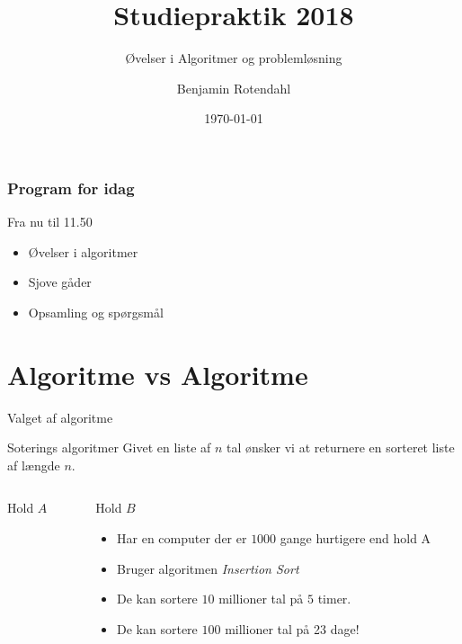 \documentclass[12pt,t]{beamer}
\title{Studiepraktik 2018}
\subtitle{Øvelser i Algoritmer og problemløsning}
\author{
  Benjamin Rotendahl  \\
}
\date[]{\today}
\begin{document}
\frame[plain]{\titlepage}
\frame{\tableofcontents}


\begin{frame}
  \frametitle{Program for idag}
  \begin{block}{Fra nu til 11.50}
    \begin{itemize}
      \item Øvelser i algoritmer \pause
      \item Sjove gåder \pause
      \item Opsamling og spørgsmål
    \end{itemize}
  \end{block}
\end{frame}


\section{Algoritme vs Algoritme}
\begin{frame}[t]{Valget af algoritme}
  \begin{exampleblock}{Soterings algoritmer}
    Givet en liste af $n$ tal ønsker vi at returnere en sorteret liste
    af længde $n$.
  \end{exampleblock}
  \pause
  \vspace{-2em}
  \begin{columns}
    \begin{column}{0.5\textwidth}
      \begin{block}{Hold $A$}
        \begin{itemize}
        \end{itemize}
      \end{block}
    \end{column}
    \begin{column}{0.5\textwidth}
      \begin{block}{Hold $B$}
        \begin{itemize}[<+->]
          \item Har en computer der er $1000$ gange hurtigere end
                hold A
          \item Bruger algoritmen \emph{Insertion Sort}
          \item De kan sortere $10$ millioner tal på $5$ timer.
          \item De kan sortere $100$ millioner tal på \alert{23 dage!}
        \end{itemize}
      \end{block}
    \end{column}
  \end{columns}
\end{frame}
\end{document}
